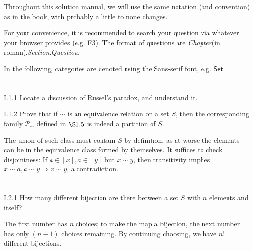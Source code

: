 Throughout this solution manual, we will use the same notation (and convention) as in the book, with probably a little to none changes.

For your convenience, it is recommended to search your question via whatever your browser provides (e.g. F3). The format of questions are \textit{Chapter}(in roman).\textit{Section.Question}.

In the following, categories are denoted using the \textsf{Sans-serif} font, e.g. $\mathsf{Set}$.

\section{}
\begin{problem}{I.1.1}
Locate a discussion of Russel's paradox, and understand it.
\end{problem}

\begin{problem}{I.1.2}
Prove that if $\sim$ is an equivalence relation on a set $S$, then the corresponding family $\mathscr{P}_\sim$ defined in $\S 1.5$ is indeed a partition of $S$.
\end{problem}
\begin{pf}
The union of such class must contain $S$ by definition, as at worse the elements can be in the equivalence class formed by themselves. It suffices to check disjointness: If $a \in [x], a \in [y]$ but $x \nsim y$, then transitivity implies $x \sim a, a \sim y \Rightarrow x \sim y$, a contradiction. 
\end{pf}

\section{}
\begin{problem}{I.2.1}
How many different bijection are there between a set $S$ with $n$ elements and itself?
\end{problem}
\begin{sol}
The first number has $n$ choices; to make the map a bijection, the next number has only $(n-1)$ choices remaining. By continuing choosing, we have $n!$ different bijections.
\end{sol}

